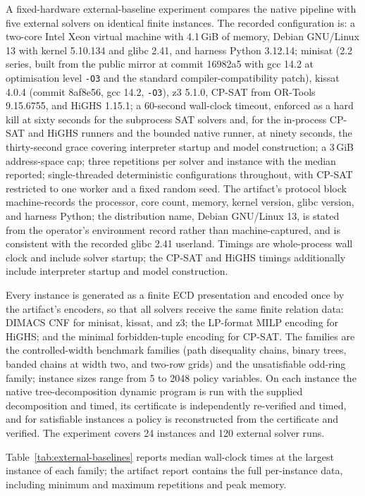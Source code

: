 \documentclass[11pt]{article}
\theoremstyle{plain}
\theoremstyle{definition}
\theoremstyle{remark}
\begin{document}
A fixed-hardware external-baseline experiment compares the native pipeline with
five external solvers on identical finite instances.  The recorded
configuration is: a two-core Intel Xeon virtual machine with 4.1\,GiB of
memory, Debian GNU/Linux 13 with kernel 5.10.134 and glibc 2.41, and
harness Python 3.12.14; minisat (2.2 series, built from the public mirror at commit
16982a5 with gcc 14.2 at optimisation level \texttt{-O3} and the standard
compiler-compatibility patch), kissat 4.0.4 (commit 8af8e56, gcc 14.2,
\texttt{-O3}), z3 5.1.0, CP-SAT
from OR-Tools 9.15.6755, and HiGHS 1.15.1; a 60-second wall-clock timeout,
enforced as a hard kill at sixty seconds for the subprocess SAT solvers and,
for the in-process CP-SAT and HiGHS runners and the bounded native runner, at
ninety seconds, the thirty-second grace covering interpreter startup and model
construction; a
3\,GiB address-space cap; three repetitions per solver and instance with the
median reported; single-threaded deterministic configurations throughout, with
CP-SAT restricted to one worker and a fixed random seed.  The artifact's
protocol block machine-records the processor, core count, memory, kernel
version, glibc version, and harness Python; the distribution name, Debian
GNU/Linux 13, is stated from the operator's environment record rather than
machine-captured, and is consistent with the recorded glibc 2.41 userland.
Timings are whole-process wall clock and include solver startup; the CP-SAT and HiGHS
timings additionally include interpreter startup and model construction.

Every instance is generated as a finite ECD presentation and encoded once by
the artifact's encoders, so that all solvers receive the same finite relation
data: DIMACS CNF for minisat, kissat, and z3; the LP-format MILP encoding for
HiGHS; and the minimal forbidden-tuple encoding for CP-SAT.  The families are
the controlled-width benchmark families (path disequality chains, binary
trees, banded chains at width two, and two-row grids) and the unsatisfiable
odd-ring family; instance sizes range from 5 to 2048 policy variables.  On each
instance the native tree-decomposition dynamic program is run with the supplied
decomposition and timed, its certificate is independently re-verified and
timed, and for satisfiable instances a policy is reconstructed from the
certificate and verified.  The experiment covers 24 instances and 120 external
solver runs.

Table~\ref{tab:external-baselines} reports median wall-clock times at the
largest instance of each family; the artifact report contains the full
per-instance data, including minimum and maximum repetitions and peak memory.
\end{document}
